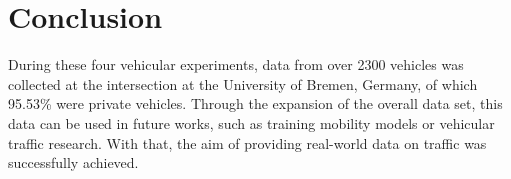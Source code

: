  \section{Conclusion}
During these four vehicular experiments, data from over 2300 vehicles was collected at the intersection at the University of Bremen, Germany, of which 95.53\% were private vehicles. Through the expansion of the overall data set, this data can be used in future works, such as training mobility models or vehicular traffic research. With that, the aim of providing real-world data on traffic was successfully achieved. \newpage